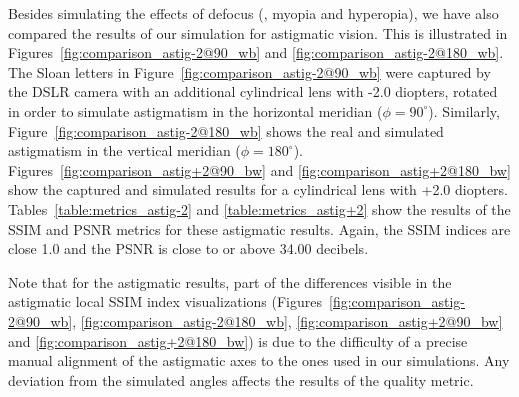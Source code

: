 Besides simulating the effects of defocus (\ie, myopia and hyperopia), we have also compared the results of our simulation for astigmatic vision.
This is illustrated in Figures~\ref{fig:comparison_astig-2@90_wb} and \ref{fig:comparison_astig-2@180_wb}.
The Sloan letters in Figure~\ref{fig:comparison_astig-2@90_wb} were captured by the DSLR camera with an additional cylindrical lens with -2.0 diopters, rotated in order to simulate astigmatism in the horizontal meridian ($\phi = 90^{\circ}$). Similarly, Figure~\ref{fig:comparison_astig-2@180_wb} shows the real and simulated astigmatism in the vertical meridian ($\phi = 180^{\circ}$). 
Figures~\ref{fig:comparison_astig+2@90_bw} and \ref{fig:comparison_astig+2@180_bw} show the captured and simulated results for a cylindrical lens with +2.0 diopters. 
Tables~\ref{table:metrics_astig-2} and \ref{table:metrics_astig+2} show the results of the SSIM and PSNR metrics for these astigmatic results. Again, the SSIM indices are close 1.0 and the PSNR is close to or above 34.00 decibels.

Note that for the astigmatic results, part of the differences visible in 
the astigmatic local SSIM index visualizations (Figures~\ref{fig:comparison_astig-2@90_wb}, \ref{fig:comparison_astig-2@180_wb}, \ref{fig:comparison_astig+2@90_bw} and \ref{fig:comparison_astig+2@180_bw}) is due to the difficulty of a precise manual alignment of the astigmatic axes to the ones used in our simulations. Any deviation from the simulated angles affects the results of the quality metric.





